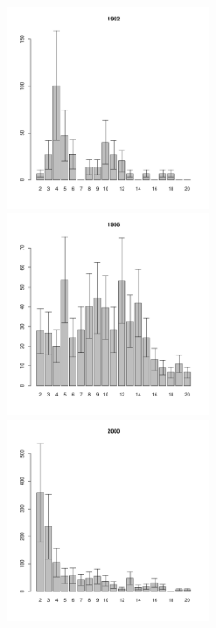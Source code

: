 \documentclass[12pt, a4paper]{article}
\begin{document}
\newpage 
\begin{figure}[h] 

\begin{multicols}{3}
\hfill
\includegraphics[width=60mm]{../White_Sea/Luvenga_II_razrez/low_beatch2_1992_.pdf}
\hfill
\includegraphics[width=60mm]{../White_Sea/Luvenga_II_razrez/low_beatch2_1996_.pdf}
\hfill
\includegraphics[width=60mm]{../White_Sea/Luvenga_II_razrez/low_beatch2_2000_.pdf}
\end{multicols}




\end{figure}
\end{document}
